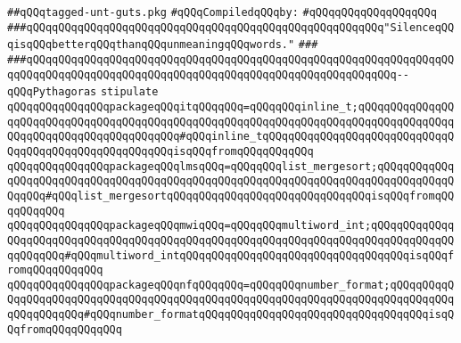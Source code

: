 \label{src/lib/std/src/tagged-unt-guts.pkg}
\verb|##qQQqtagged-unt-guts.pkg|\newline
\newline
\verb|#qQQqCompiledqQQqby:|\newline
\verb|#qQQqqQQqqQQqqQQqqQQq|\newline
\newline
\verb|###qQQqqQQqqQQqqQQqqQQqqQQqqQQqqQQqqQQqqQQqqQQqqQQqqQQqqQQq"SilenceqQQqisqQQqbetterqQQqthanqQQqunmeaningqQQqwords."|\newline
\verb|###|\newline
\verb|###qQQqqQQqqQQqqQQqqQQqqQQqqQQqqQQqqQQqqQQqqQQqqQQqqQQqqQQqqQQqqQQqqQQqqQQqqQQqqQQqqQQqqQQqqQQqqQQqqQQqqQQqqQQqqQQqqQQqqQQqqQQqqQQq--qQQqPythagoras|\newline
\newline
\newline
\newline
\verb|stipulate|\newline
\verb|qQQqqQQqqQQqqQQqpackageqQQqitqQQqqQQq=qQQqqQQqinline_t;qQQqqQQqqQQqqQQqqQQqqQQqqQQqqQQqqQQqqQQqqQQqqQQqqQQqqQQqqQQqqQQqqQQqqQQqqQQqqQQqqQQqqQQqqQQqqQQqqQQqqQQqqQQqqQQq#qQQqinline_tqQQqqQQqqQQqqQQqqQQqqQQqqQQqqQQqqQQqqQQqqQQqqQQqqQQqqQQqisqQQqfromqQQqqQQqqQQq|\newline
\verb|qQQqqQQqqQQqqQQqpackageqQQqlmsqQQq=qQQqqQQqlist_mergesort;qQQqqQQqqQQqqQQqqQQqqQQqqQQqqQQqqQQqqQQqqQQqqQQqqQQqqQQqqQQqqQQqqQQqqQQqqQQqqQQqqQQqqQQq#qQQqlist_mergesortqQQqqQQqqQQqqQQqqQQqqQQqqQQqqQQqisqQQqfromqQQqqQQqqQQq|\newline
\verb|qQQqqQQqqQQqqQQqpackageqQQqmwiqQQq=qQQqqQQqmultiword_int;qQQqqQQqqQQqqQQqqQQqqQQqqQQqqQQqqQQqqQQqqQQqqQQqqQQqqQQqqQQqqQQqqQQqqQQqqQQqqQQqqQQqqQQqqQQq#qQQqmultiword_intqQQqqQQqqQQqqQQqqQQqqQQqqQQqqQQqqQQqisqQQqfromqQQqqQQqqQQq|\newline
\verb|qQQqqQQqqQQqqQQqpackageqQQqnfqQQqqQQq=qQQqqQQqnumber_format;qQQqqQQqqQQqqQQqqQQqqQQqqQQqqQQqqQQqqQQqqQQqqQQqqQQqqQQqqQQqqQQqqQQqqQQqqQQqqQQqqQQqqQQqqQQq#qQQqnumber_formatqQQqqQQqqQQqqQQqqQQqqQQqqQQqqQQqqQQqisqQQqfromqQQqqQQqqQQq|\newline
